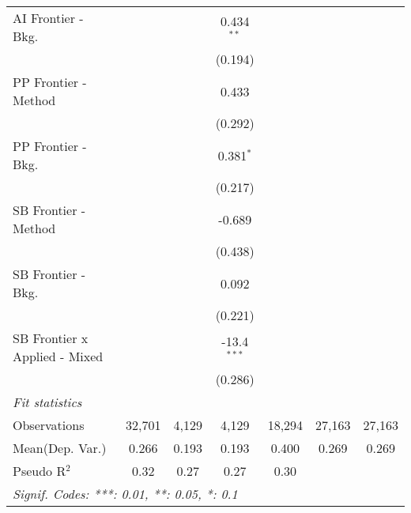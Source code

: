 \begin{tabular}{lcccccc}
   AI Frontier - Bkg.            &               &              & 0.434$^{**}$  &               &        &   \\   
                                 &               &              & (0.194)       &               &        &   \\   
   PP Frontier - Method          &               &              & 0.433         &               &        &   \\   
                                 &               &              & (0.292)       &               &        &   \\   
   PP Frontier - Bkg.            &               &              & 0.381$^{*}$   &               &        &   \\   
                                 &               &              & (0.217)       &               &        &   \\   
   SB Frontier - Method          &               &              & -0.689        &               &        &   \\   
                                 &               &              & (0.438)       &               &        &   \\   
   SB Frontier - Bkg.            &               &              & 0.092         &               &        &   \\   
                                 &               &              & (0.221)       &               &        &   \\   
   SB Frontier x Applied - Mixed &               &              & -13.4$^{***}$ &               &        &   \\   
                                 &               &              & (0.286)       &               &        &   \\   
   \midrule
   \emph{Fit statistics}\\
   Observations                  & 32,701        & 4,129        & 4,129         & 18,294        & 27,163 & 27,163\\  
Mean(Dep. Var.) & 0.266 & 0.193 & 0.193 & 0.400 & 0.269 & 0.269 \\
   Pseudo R$^2$                  & 0.32          & 0.27         & 0.27          & 0.30          &        & \\  
   \midrule \midrule
   \multicolumn{7}{l}{\emph{Signif. Codes: ***: 0.01, **: 0.05, *: 0.1}}\\
\end{tabular}
\par\endgroup
